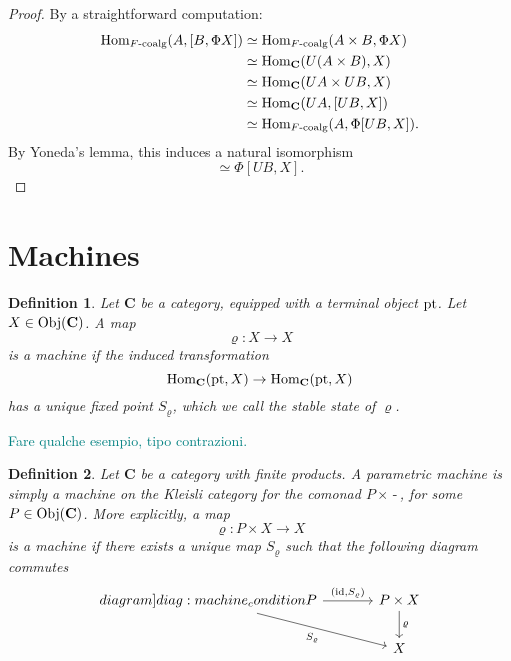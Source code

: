 \documentclass[12pt]{article}
\newtheorem{definition}{Definition}
\newcommand{\pietro}[1]{\textcolor{teal}{#1}}
\newcommand{\pt}{{\textnormal{pt}}}
\newcommand{\Hom}{{\textnormal{Hom}}}
\newcommand{\Obj}{{\textnormal{Obj}}}
\newcommand{\id}{{\textnormal{id}}}
\newcommand{\Cat}{{\mathbf{C}}}
\newcommand{\FCoalg}{{F\textnormal{-coalg}}}
\newcommand{\anon}{{\,\mbox{-}\,}}
\begin{document}
\begin{proof}
    By a straightforward computation:
    \begin{align*}
        \Hom_{\FCoalg}(A, [B, \Phi X])
         & \simeq \Hom_{\FCoalg}(A\times B, \Phi X)     \\
         & \simeq \Hom_{\Cat}(U(A \times B), X)  \\
         & \simeq \Hom_{\Cat}(UA \times UB, X)   \\
         & \simeq \Hom_{\Cat}(UA, [UB, X])       \\
         & \simeq \Hom_{\FCoalg}(A, \Phi[UB, X]).
    \end{align*}
    By Yoneda's lemma, this induces a natural isomorphism
    \begin{equation*}
        [B, \Phi X] \simeq \Phi[UB, X].
    \end{equation*}
\end{proof}

\section{Machines}

\begin{definition}\label{def:machine}
    Let $\Cat$ be a category, equipped with a terminal object $\pt$. Let $X \in \Obj(\Cat)$. A map
    \begin{equation*}
        \varrho \colon X \rightarrow X
    \end{equation*}
    is a {\em machine} if the induced transformation
    \begin{equation*}
        \Hom_\Cat(\pt, X) \rightarrow \Hom_\Cat(\pt, X)
    \end{equation*}
    has a unique fixed point $S_\varrho$, which we call the {\em stable state} of $\varrho$.
\end{definition}

\pietro{Fare qualche esempio, tipo contrazioni.}

\begin{definition}\label{def:parametric_machine}
    Let $\Cat$ be a category with finite products. A {\em parametric machine} is simply a machine on the Kleisli category for the comonad $P \times \anon$, for some $P \in \Obj(\Cat)$. More explicitly, a map
    \begin{equation*}
        \varrho \colon P \times X \rightarrow X
    \end{equation*}
    is a {\em machine} if there exists a unique map $S_\varrho$ such that the following diagram commutes
    \begin{equation}
        \begin{tikzcd}[column sep=large]\label[diagram]{diag:machine_condition}
            P \arrow[rightarrow]{r}{\left(\id, S_\varrho\right)}
            \arrow[rightarrow,swap]{dr}{S_\varrho}
            & P \times X \arrow[rightarrow]{d}{\varrho} \\
            & X
        \end{tikzcd}
    \end{equation}
\end{definition}
\end{document}
